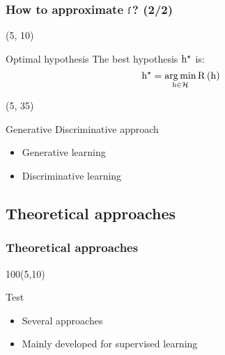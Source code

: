 \begin{frame}
  \frametitle{How to approximate $\mathrm{f}$? (2/2)}

  \begin{textblock}{90}(5, 10)
    \begin{block}{Optimal hypothesis}
      The best hypothesis $\mathrm{h}^{\star}$ is:
      \[
        \mathrm{h}^{\star} = \operatorname*{arg\,min}_{\mathrm{h} \in \mathcal{H}} \mathrm{R} \left ( {\mathrm{h}} \right )
      \]
    \end{block}
  \end{textblock}

  \begin{textblock}{90}(5, 35)
    \begin{block}{Generative \vs{} Discriminative approach}
      \begin{itemize}
      \item Generative learning
      \item Discriminative learning
      \end{itemize}
    \end{block}
  \end{textblock}
\end{frame}


\subsection{Theoretical approaches}

\begin{frame}
  \frametitle{Theoretical approaches}

  \begin{textblock}{100}(5,10)
    \begin{block}{Test}
      \begin{itemize}
      \item Several approaches
      \item Mainly developed for supervised learning
      \end{itemize}
    \end{block}
  \end{textblock}
\end{frame}

